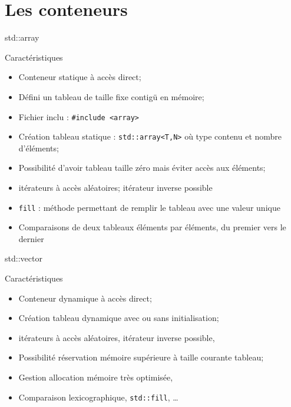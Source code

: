 \documentclass[handout,10pt]{beamer}
\newcommand{\includepartcode}[4][cpp]{

}
\begin{document}
\section{Les conteneurs}

\begin{frame}[fragile]{std::array}
\tiny
 \begin{block}{Caractéristiques}
  \begin{itemize}
   \item Conteneur statique à accès direct;
   \item Défini un tableau de taille fixe contigü en mémoire;
   \item Fichier inclu : \lstinline$#include <array>$
   \item Création tableau statique : \lstinline$std::array<T,N>$ où \verb@T@ type contenu et \verb@N@ nombre d'éléments;
   \item Possibilité d'avoir tableau taille zéro mais éviter accès aux éléments;
   \item itérateurs à accès aléatoires; itérateur inverse possible
   \item \lstinline$fill$ : méthode permettant de remplir le tableau avec une valeur unique
   \item Comparaisons de deux tableaux éléments par éléments, du premier vers le dernier
  \end{itemize}
 \end{block}
 \includepartcode{array.cpp}{7}{19}
\end{frame}

\begin{frame}[fragile]{std::vector}
\tiny
\begin{block}{Caractéristiques}
\begin{itemize}
\item Conteneur dynamique à accès direct;
\item Création tableau dynamique avec ou sans initialisation;
\item itérateurs à accès aléatoires, itérateur inverse possible,
\item Possibilité réservation mémoire supérieure à taille courante tableau;
\item Gestion allocation mémoire très optimisée,
\item Comparaison lexicographique, \lstinline$std::fill$, \dots
\end{itemize}
\end{block}
\includepartcode{vector.cpp}{7}{19}
\end{frame}
\end{document}
